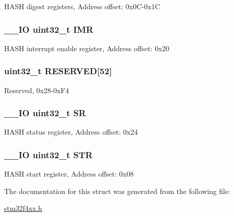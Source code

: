 H\-A\-S\-H digest registers, Address offset\-: 0x0\-C-\/0x1\-C \hypertarget{struct_h_a_s_h___type_def_ae845b86e973b4bf8a33c447c261633f6}{
\subsubsection[{I\-M\-R}]{\setlength{\rightskip}{0pt plus 5cm}\-\_\-\-\_\-\-I\-O uint32\-\_\-t I\-M\-R}}\label{struct_h_a_s_h___type_def_ae845b86e973b4bf8a33c447c261633f6}
H\-A\-S\-H interrupt enable register, Address offset\-: 0x20 \hypertarget{struct_h_a_s_h___type_def_a31675cbea6dc1b5f7de162884a4bb6eb}{
\subsubsection[{R\-E\-S\-E\-R\-V\-E\-D}]{\setlength{\rightskip}{0pt plus 5cm}uint32\-\_\-t R\-E\-S\-E\-R\-V\-E\-D\mbox{[}52\mbox{]}}}\label{struct_h_a_s_h___type_def_a31675cbea6dc1b5f7de162884a4bb6eb}
Reserved, 0x28-\/0x\-F4 \hypertarget{struct_h_a_s_h___type_def_af6aca2bbd40c0fb6df7c3aebe224a360}{
\subsubsection[{S\-R}]{\setlength{\rightskip}{0pt plus 5cm}\-\_\-\-\_\-\-I\-O uint32\-\_\-t S\-R}}\label{struct_h_a_s_h___type_def_af6aca2bbd40c0fb6df7c3aebe224a360}
H\-A\-S\-H status register, Address offset\-: 0x24 \hypertarget{struct_h_a_s_h___type_def_a7060ac1ed928ee931d7664650f2dcf75}{
\subsubsection[{S\-T\-R}]{\setlength{\rightskip}{0pt plus 5cm}\-\_\-\-\_\-\-I\-O uint32\-\_\-t S\-T\-R}}\label{struct_h_a_s_h___type_def_a7060ac1ed928ee931d7664650f2dcf75}
H\-A\-S\-H start register, Address offset\-: 0x08 

The documentation for this struct was generated from the following file\-:\begin{DoxyCompactItemize}
\item 
\hyperlink{stm32f4xx_8h}{stm32f4xx.\-h}\end{DoxyCompactItemize}
